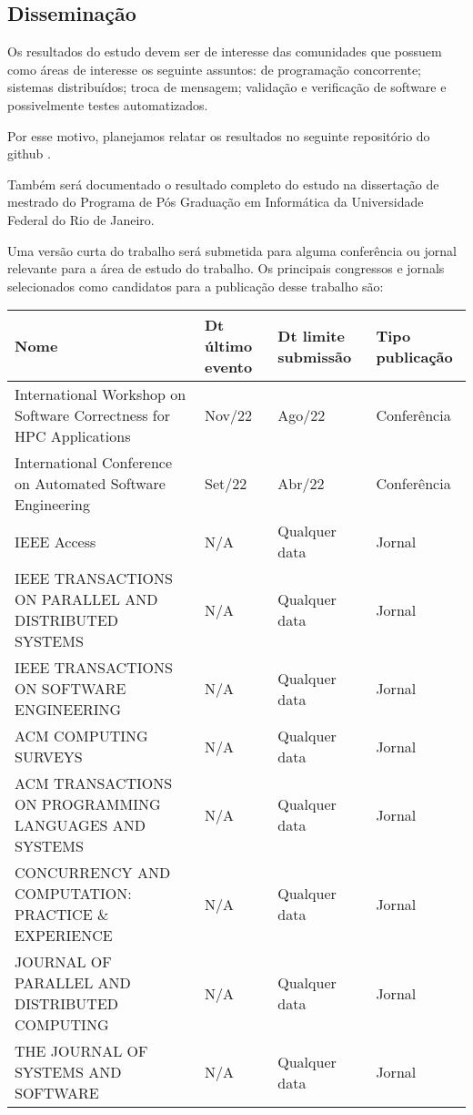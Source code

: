 \subsection{Disseminação}

Os resultados do estudo devem ser de interesse das comunidades que possuem como áreas de interesse os seguinte assuntos: de programação concorrente; sistemas distribuídos; troca de mensagem; validação e verificação de software e possivelmente testes automatizados. 

Por esse motivo, planejamos relatar os resultados no seguinte repositório do github \cite{repositorioGithub}. 

Também será documentado o resultado completo do estudo na dissertação de mestrado do Programa de Pós Graduação em Informática da Universidade Federal do Rio de Janeiro. 

Uma versão curta do trabalho será submetida para alguma conferência ou jornal relevante para a área de estudo do trabalho. Os principais congressos e jornals selecionados como candidatos para a publicação desse trabalho são:


\begin{center}
\begin{tabular}{|p{8cm}|p{2cm}|p{3cm}|p{2cm}|}
\hline
\textbf{Nome} & \textbf{Dt último evento} & \textbf{Dt limite submissão} & \textbf{Tipo publicação} \\
\hline 
International Workshop on Software Correctness for HPC Applications & Nov/22 & Ago/22 & Conferência \\ 
\hline 
International Conference on Automated Software Engineering & Set/22 & Abr/22 & Conferência \\ 
\hline 
IEEE Access & N/A & Qualquer data & Jornal \\ 
\hline 
IEEE TRANSACTIONS ON PARALLEL AND DISTRIBUTED SYSTEMS & N/A & Qualquer data & Jornal \\ 
\hline 
IEEE TRANSACTIONS ON SOFTWARE ENGINEERING & N/A & Qualquer data & Jornal \\ 
\hline 
ACM COMPUTING SURVEYS & N/A & Qualquer data & Jornal \\ 
\hline 
ACM TRANSACTIONS ON PROGRAMMING LANGUAGES AND SYSTEMS & N/A & Qualquer data & Jornal \\ 
\hline 
CONCURRENCY AND COMPUTATION: PRACTICE \& EXPERIENCE & N/A & Qualquer data & Jornal \\ 
\hline 
JOURNAL OF PARALLEL AND DISTRIBUTED COMPUTING & N/A & Qualquer data & Jornal \\ 
\hline 
THE JOURNAL OF SYSTEMS AND SOFTWARE & N/A & Qualquer data & Jornal \\ 
\hline
\end{tabular}
\end{center}
